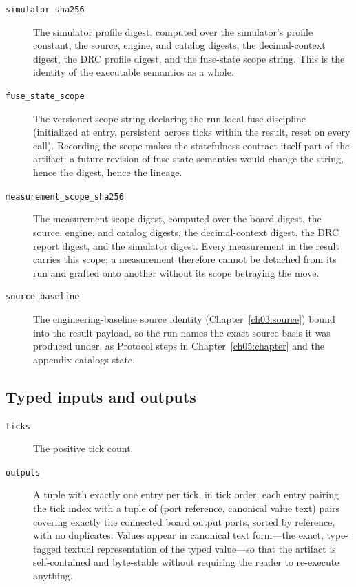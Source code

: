 \begin{description}
\item[\texttt{simulator\_sha256}] The simulator profile digest, computed over the simulator's profile constant, the source, engine, and catalog digests, the decimal-context digest, the DRC profile digest, and the fuse-state scope string. This is the identity of the executable semantics as a whole.
\item[\texttt{fuse\_state\_scope}] The versioned scope string declaring the run-local fuse discipline (initialized at entry, persistent across ticks within the result, reset on every call). Recording the scope makes the statefulness contract itself part of the artifact: a future revision of fuse state semantics would change the string, hence the digest, hence the lineage.
\item[\texttt{measurement\_scope\_sha256}] The measurement scope digest, computed over the board digest, the source, engine, and catalog digests, the decimal-context digest, the DRC report digest, and the simulator digest. Every measurement in the result carries this scope; a measurement therefore cannot be detached from its run and grafted onto another without its scope betraying the move.
\item[\texttt{source\_baseline}] The engineering-baseline source identity (Chapter~\ref{ch03:source}) bound into the result payload, so the run names the exact source basis it was produced under, as Protocol steps in Chapter~\ref{ch05:chapter} and the appendix catalogs state.
\end{description}

\subsection{Typed inputs and outputs}

\begin{description}
\item[\texttt{ticks}] The positive tick count.
\item[\texttt{outputs}] A tuple with exactly one entry per tick, in tick order, each entry pairing the tick index with a tuple of (port reference, canonical value text) pairs covering exactly the connected board output ports, sorted by reference, with no duplicates. Values appear in canonical text form---the exact, type-tagged textual representation of the typed value---so that the artifact is self-contained and byte-stable without requiring the reader to re-execute anything.
\end{description}


